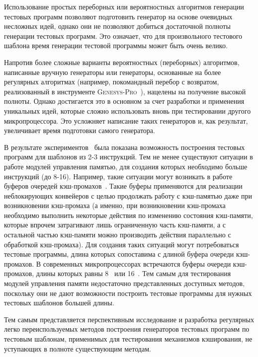 Использование простых переборных или вероятностных алгоритмов
генерации тестовых программ позволяют подготовить генератор на
основе очевидных несложных идей, однако они не позволяют добиться
достаточной полноты генерации тестовых программ. Это означает, что
для произвольного тестового шаблона время генерации тестовой
программы может быть очень велико.

Напротив более сложные варианты вероятностных (переборных)
алгоритмов, написанные вручную генераторы или генераторы, основанные
на более регулярных алгоритмах (например, покомандный перебор с
возвратом, реализованный в инструменте \textsc{Genesys-Pro}~\cite{GenesysPro}),
нацелены на получение высокой полноты. Однако достигается это в
основном за счет разработки и применения уникальных идей, которые
сложно использовать вновь при тестировании другого микропроцессора.
Это усложняет написание таких генераторов и, как результат,
увеличивает время подготовки самого генератора.

В результате экспериментов~\cite{vorobyev} была показана возможность
построения тестовых программ для шаблонов из 2-3 инструкций. Тем не
менее существуют ситуации в работе модулей управления памятью, для
создания которых необходимо больше инструкций (до 8-16). Например,
такие ситуации могут возникать в работе буферов очередей
кэш-промахов~\cite{HennesyPatterson}. Такие буферы применяются для
реализации неблокирующих конвейеров с целью продолжать работу с
кэш-памятью даже при возникновении кэш-промаха (а именно, при
возникновении кэш-промаха необходимо выполнить некоторые действия по
изменению состояния кэш-памяти, которые впрочем затрагивают лишь
ограниченную часть кэш-памяти, а с остальной частью кэш-памяти можно
производить действия параллельно с обработкой кэш-промаха). Для
создания таких ситуаций могут потребоваться тестовые программы,
длина которых сопоставима с длиной буфера очереди кэш-промахов. В
современных микропроцессорах встречаются буферы очереди
кэш-промахов, длины которых равны 8~\cite{Alpha21264} или
16~\cite{Alpha21364, Cell}. Тем самым для тестирования модулей
управления памяти недостаточно представленных доступных методов,
поскольку они не дают возможности построить тестовые программы для
нужных тестовых шаблонов большей длины.

Тем самым представляется перспективным исследование и разработка
регулярных легко переиспользуемых методов построения генераторов
тестовых программ по тестовым шаблонам, применимых для тестирования
механизмов кэширования, не уступающих в полноте существующим
методам.

